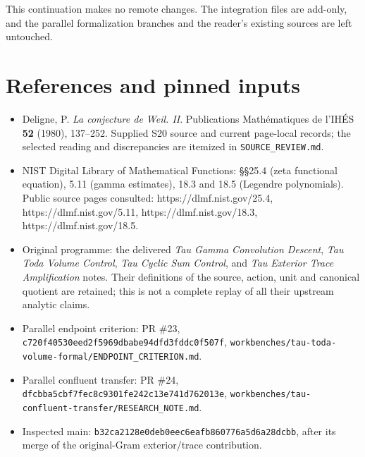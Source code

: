\documentclass[
  11pt,
]{article}
\providecommand{\tightlist}{%
  \setlength{\itemsep}{0pt}\setlength{\parskip}{0pt}}
\begin{document}
This continuation makes no remote changes. The integration files are
add-only, and the parallel formalization branches and the reader's
existing sources are left untouched.

\section{References and pinned
inputs}\label{references-and-pinned-inputs}

\begin{itemize}
\tightlist
\item
  Deligne, P. \emph{La conjecture de Weil. II}. Publications
  Mathématiques de l'IHÉS \textbf{52} (1980), 137--252. Supplied S20
  source and current page-local records; the selected reading and
  discrepancies are itemized in \texttt{SOURCE\_REVIEW.md}.
\item
  NIST Digital Library of Mathematical Functions: §§25.4 (zeta
  functional equation), 5.11 (gamma estimates), 18.3 and 18.5 (Legendre
  polynomials). Public source pages consulted:
  https://dlmf.nist.gov/25.4, https://dlmf.nist.gov/5.11,
  https://dlmf.nist.gov/18.3, https://dlmf.nist.gov/18.5.
\item
  Original programme: the delivered \emph{Tau Gamma Convolution
  Descent}, \emph{Tau Toda Volume Control}, \emph{Tau Cyclic Sum
  Control}, and \emph{Tau Exterior Trace Amplification} notes. Their
  definitions of the source, action, unit and canonical quotient are
  retained; this is not a complete replay of all their upstream analytic
  claims.
\item
  Parallel endpoint criterion: PR \#23,
  \texttt{c720f40530eed2f5969dbabe94dfd3fddc0f507f},
  \texttt{workbenches/tau-toda-volume-formal/ENDPOINT\_CRITERION.md}.
\item
  Parallel confluent transfer: PR \#24,
  \texttt{dfcbba5cbf7fec8c9301fe242c13e741d762013e},
  \texttt{workbenches/tau-confluent-transfer/RESEARCH\_NOTE.md}.
\item
  Inspected main: \texttt{b32ca2128e0deb0eec6eafb860776a5d6a28dcbb},
  after its merge of the original-Gram exterior/trace contribution.
\end{itemize}
\end{document}
